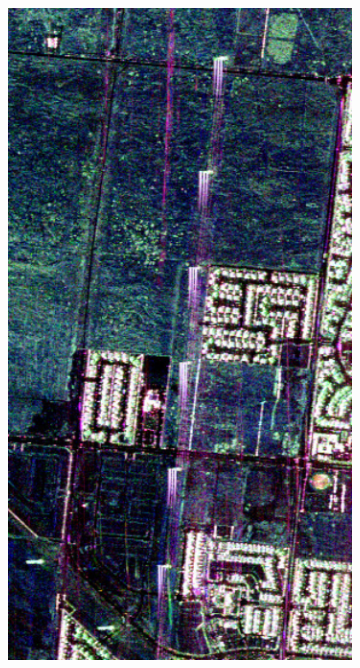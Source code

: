 \begin{figure}[t]
\centering
\begin{subfigure}[b]{0.2\columnwidth}
		\includegraphics[width=\textwidth]{Figures/CD/A2_2009}
		\caption{}
		\label{fig:3_a}
\end{subfigure}
\hspace{0.01pt}
\begin{subfigure}[b]{0.2\columnwidth}

\end{subfigure}
\end{figure}

